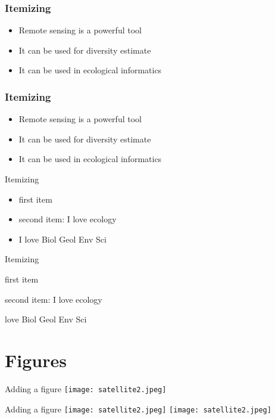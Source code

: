 \documentclass{beamer}
\begin{document}
\begin{frame}
 \frametitle{Itemizing}
 \begin{itemize}
  \item<1> Remote sensing is a powerful tool
  \item<2> It can be used for diversity estimate
  \item<3> It can be used in ecological informatics
 \end{itemize}
\end{frame}

\begin{frame}
 \frametitle{Itemizing}
 \begin{itemize}
  \item<1-> Remote sensing is a powerful tool
  \item<2-> It can be used for diversity estimate
  \item<3-> It can be used in ecological informatics
 \end{itemize}
\end{frame}



\begin{frame}{Itemizing}
\begin{itemize}
    \item first item
    \item second item: I love ecology
    \item I love Biol Geol Env Sci
\end{itemize}
\end{frame}

\begin{frame}{Itemizing}
\begin{itemize}
\tiny{
    \item<1-> first item
    \item<2-> second item: I love ecology
    \item<3-> love Biol Geol Env Sci
}
\end{itemize}
\end{frame}

\section{Figures}
\begin{frame}{Adding a figure}
\centering
 \texttt{[image: satellite2.jpeg]}
\end{frame}

\begin{frame}{Adding a figure}
\centering
 \texttt{[image: satellite2.jpeg]}
 \texttt{[image: satellite2.jpeg]}
\end{frame}
\end{document}
